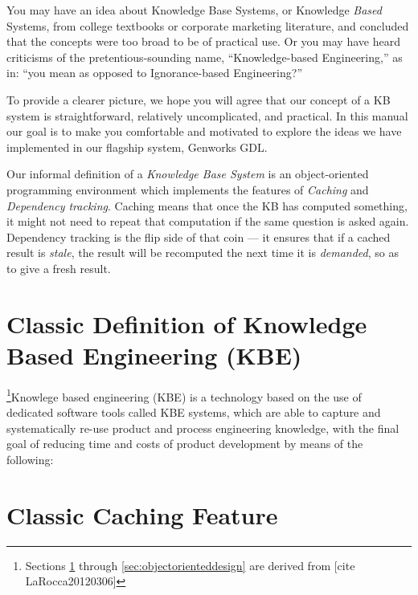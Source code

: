 \documentclass [11pt]{book}
\begin{document}
\label{sec:knowledgebaseconceptsaccordingtogenworks}

You may have an idea about Knowledge Base Systems,
or Knowledge \emph{Based} Systems, from college textbooks or corporate marketing
literature, and concluded that the concepts were too broad to be of
practical use. Or you may have heard criticisms of the
pretentious-sounding name, ``Knowledge-based Engineering,'' as in:
``you mean as opposed to Ignorance-based Engineering?'' 

To provide a clearer picture, we hope you will agree that our concept
of a KB system is straightforward, relatively uncomplicated, and
practical. In this manual  our goal is to make you comfortable
and motivated to explore the ideas we have implemented in our flagship
system, Genworks GDL.

Our informal definition of a \emph{Knowledge Base System} is an object-oriented programming environment which implements the features of \emph{Caching} and \emph{Dependency tracking}. Caching means that once the KB has computed something, it might not need to repeat 
that computation if the same question is asked again. Dependency tracking is the flip side
of that coin --- it ensures that if a cached result is \emph{stale}, the result will be recomputed the next time it is \emph{demanded}, so as to give a fresh result.

\section{Classic Definition of Knowledge Based Engineering (KBE)}

\label{sec:classicdefinitionofknowledgebasedengineering(kbe)}

\footnote{Sections 
\ref{sec:classicdefinitionofknowledgebasedengineering(kbe)} through 
\ref{sec:objectorienteddesign} are derived from [cite LaRocca20120306]}Knowlege based engineering (KBE) is a technology based on the
use of dedicated software tools called KBE systems, which are able to
capture and systematically re-use product and process engineering
knowledge, with the final goal of reducing time and costs of product
development by means of the following:
\ul{
}

\section{Classic Caching Feature}
\end{document}

